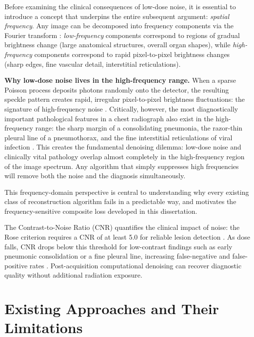\documentclass[12pt, a4paper, twoside, openright]{book}
\begin{document}
Before examining the clinical consequences of low-dose noise, it is essential to introduce a concept that underpins the entire subsequent argument: \textit{spatial frequency}. Any image can be decomposed into frequency components via the Fourier transform \cite{rahaman_spectral_2019}: \textit{low-frequency} components correspond to regions of gradual brightness change (large anatomical structures, overall organ shapes), while \textit{high-frequency} components correspond to rapid pixel-to-pixel brightness changes (sharp edges, fine vascular detail, interstitial reticulations).

\textbf{Why low-dose noise lives in the high-frequency range.} When a sparse Poisson process deposits photons randomly onto the detector, the resulting speckle pattern creates rapid, irregular pixel-to-pixel brightness fluctuations: the signature of high-frequency noise \cite{foi_practical_2008}. Critically, however, the most diagnostically important pathological features in a chest radiograph also exist in the high-frequency range: the sharp margin of a consolidating pneumonia, the razor-thin pleural line of a pneumothorax, and the fine interstitial reticulations of viral infection \cite{wang_high-frequency_2020}. This creates the fundamental denoising dilemma: low-dose noise and clinically vital pathology overlap almost completely in the high-frequency region of the image spectrum. Any algorithm that simply suppresses high frequencies will remove both the noise and the diagnosis simultaneously.

This frequency-domain perspective is central to understanding why every existing class of reconstruction algorithm fails in a predictable way, and motivates the frequency-sensitive composite loss developed in this dissertation.


The Contrast-to-Noise Ratio (CNR) quantifies the clinical impact of noise: the Rose criterion requires a CNR of at least 5.0 for reliable lesion detection \cite{rose_sensitivity_1948}. As dose falls, CNR drops below this threshold for low-contrast findings such as early pneumonic consolidation or a fine pleural line, increasing false-negative and false-positive rates \cite{bhadra_hallucinations_2021}. Post-acquisition computational denoising can recover diagnostic quality without additional radiation exposure.

\section{Existing Approaches and Their Limitations}
\label{sec:intro:existing}
\end{document}

